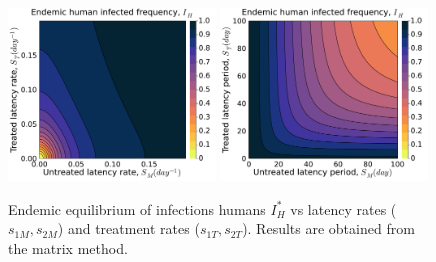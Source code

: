 \documentclass{article}
\begin{document}
\begin{figure}[H]
    \centering
    \includegraphics[width=0.49\textwidth]{../../fig/Ih_STxSM.pdf}
    \includegraphics[width=0.49\textwidth]{../../fig/Ih_STxSM_rev.pdf}
    \caption{Endemic equilibrium of infections humans \(I_H^*\) vs latency rates (\(s_{1M},s_{2M}\)) and treatment rates (\(s_{1T},s_{2T}\)). Results are obtained from the matrix method.}
\end{figure}
\end{document}
